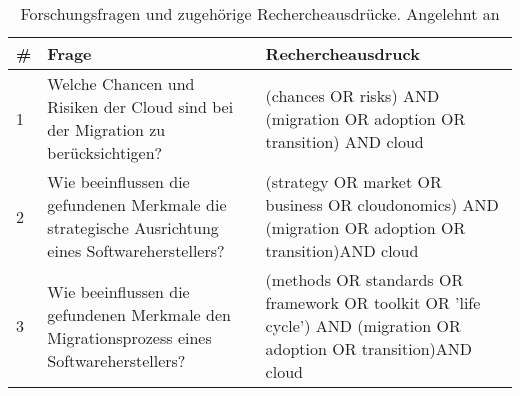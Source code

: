 %
%
\begin{table}[h]
\centering
\begin{tabular}{|l|p{}|p{}|}
	\hline
	\textbf{\#} & \textbf{Frage} & \textbf{Rechercheausdruck} \\
	\hline
	1 & Welche Chancen und Risiken der Cloud sind bei der 
Migration zu berücksichtigen? & 
(chances OR risks) \newline
AND \newline
(migration OR adoption OR transition) \newline
AND \newline
cloud
\\
	\hline
	2 & Wie beeinflussen die gefundenen Merkmale die strategische 
Ausrichtung eines Softwareherstellers? & 
(strategy OR market OR business OR cloudonomics) \newline 
AND\newline 
(migration OR adoption OR transition)\newline AND\newline
cloud\\
	\hline
	3 & Wie beeinflussen die gefundenen Merkmale den Migrationsprozess 
eines Softwareherstellers? & (methods 
OR 
standards OR framework OR toolkit OR 'life cycle') \newline AND\newline 
(migration OR adoption OR transition)\newline AND\newline
cloud\\	
	\hline

\end{tabular}
\caption{Forschungsfragen und zugehörige Rechercheausdrücke. Angelehnt 
an \cite{exploring_the_factors}}
\label{tab:searchstrings}
\end{table}
\begin{comment}
	\hline
	1 & In welche Aufgaben lässt sich die Migration 
einer On-Premise-Software zu Salesforce unterteilen? & (tasks OR 
needs OR requirements)\newline AND\newline (migration OR adoption)\newline 
AND\newline salesforce
\\
	\hline
	2 & Welche Methoden unterstützen diesen Migrationsprozess? & (methods 
OR 
standards OR framework) \newline AND\newline 
('cloud migration' OR 'cloud adaption' OR 'salesforce') \\
	\hline
	3 & Wie unterstützt Salesforce die Migration technisch? & (tools OR 
interfaces OR api)\newline AND\newline (migration OR 
adoption)\newline 
AND\newline salesforce\\
	\hline
\end{comment}
